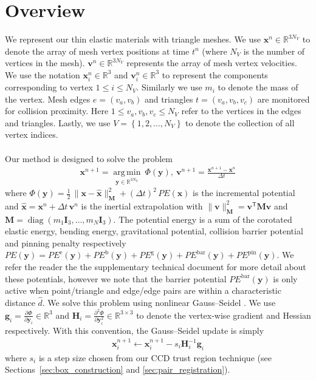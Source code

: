 \documentclass[acmtog,anonymous,review]{acmart}
\newcommand{\xx}{\mathbf{x}}
\renewcommand{\gg}{\mathbf{g}}
\newcommand{\HH}{\mathbf{H}}
\newcommand{\yy}{\mathbf{y}}
\renewcommand{\vv}{\mathbf{v}}
\DeclareMathOperator*{\argmin}{arg\,min}
\DeclareMathOperator{\diag}{diag}
\begin{document}
\section{Overview}
\label{sec:gs_ipc}
We represent our thin elastic materials with triangle meshes.
We use $\mathbf{x}^n\in\mathbb{R}^{3N_V}$ to denote the array of mesh vertex positions at time $t^n$ (where $N_V$ is the number of vertices in the mesh).
$\mathbf{v}^n\in\mathbb{R}^{3N_V}$ represents the array of mesh vertex velocities.
We use the notation $\mathbf{x}^n_i\in\mathbb{R}^3$ and $\mathbf{v}^n_i\in\mathbb{R}^3$ to represent the components corresponding to vertex $1\leq i \leq N_V$.
Similarly we use $m_i$ to denote the mass of the vertex.
Mesh edges $e=(v_a,v_b)$ and triangles $t=(v_a,v_b,v_c)$ are monitored for collision proximity.
Here $1\leq v_a,v_b,v_c \leq N_V$ refer to the vertices in the edges and triangles.
Lastly, we use $V=\left\{1,2,\hdots,N_V\right\}$ to denote the collection of all vertex indices.\\
\\
Our method is designed to solve the problem
\begin{align}
\xx^{n+1}=\underset{\yy\in\mathbb{R}^{3N_V}}{\argmin} \ \Phi(\yy), \
\vv^{n+1}=\frac{\xx^{n+1}-\xx^n}{\Delta t}\label{eq:ipc}
\end{align}
where $\Phi(\yy)=\tfrac{1}{2}\,
\|\mathbf{x}-\hat{\mathbf{x}}\|_{\mathbf{M}}^{2}
+
(\Delta t)^2\,PE(\mathbf{x})$ is the incremental potential \cite{ferguson2021ipc, li2020ipc} and $\hat{\mathbf{x}}=\mathbf{x}^n+\Delta t\,\mathbf{v}^n$ is the
inertial extrapolation with $\|\mathbf{v}\|_{\mathbf{M}}^{2}
=\mathbf{v}^{\mathsf T}\mathbf{M}\mathbf{v}$ and 
$\mathbf{M}=\diag(m_1\mathbf{I}_3,\dots,m_N\mathbf{I}_3)$.
The potential energy is a sum of the corotated elastic energy,
bending energy, gravitational potential, collision barrier potential and pinning
penalty respectively 
$PE(\yy)
=
PE^{\mathrm{e}}(\yy)
+
PE^{\mathrm{b}}(\yy)
+
PE^{\mathrm{g}}(\yy)
+
PE^{\mathrm{bar}}(\yy)
+
PE^{\mathrm{pin}}(\yy)$.
We refer the reader the the supplementary technical document for more detail about these potentials, however we note that the barrier potential $PE^{\mathrm{bar}}(\yy)$ is only active when point/triangle and edge/edge pairs are within a characteristic distance $\hat{d}$.
We solve this problem using nonlinear Gauss--Seidel \cite{chen2024vbd,chen2024xpbd}.
We use $\gg_i=\frac{\partial \Phi}{\partial \yy_i}\in\mathbb{R}^3$ and $\HH_i=\frac{\partial^2 \Phi}{\partial \yy_i^2}\in\mathbb{R}^{3\times 3}$ to denote the vertex-wise gradient and Hessian respectively.
With this convention, the Gauss--Seidel update is simply
\begin{align}\label{eq:ngs}
\xx_i^{n+1} \gets \xx_i^{n+1} - s_i \HH_i^{-1}\gg_i 
\end{align}
where $s_i$ is a step size chosen from our CCD trust region technique (see Sections~\ref{sec:box_construction} and \ref{sec:pair_registration}).
\end{document}
